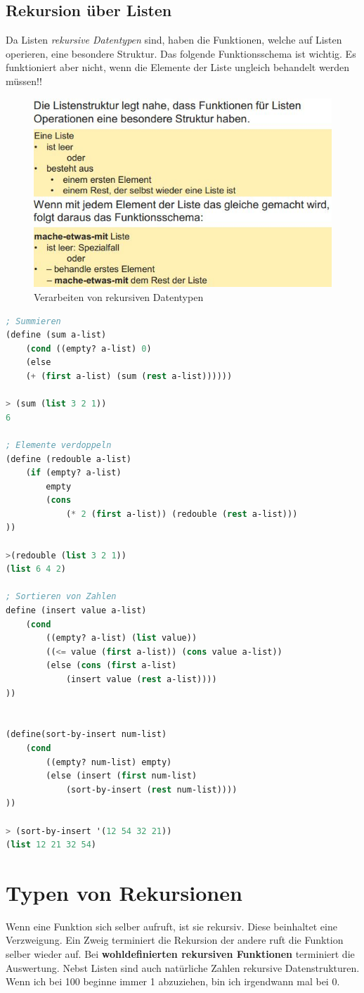 \subsection{Rekursion über Listen}
Da Listen \emph{rekursive Datentypen} sind, haben die Funktionen, welche auf Listen operieren, eine besondere Struktur. Das folgende Funktionsschema ist wichtig. Es funktioniert aber nicht, wenn die Elemente der Liste ungleich behandelt werden müssen!!

\begin{figure}[h!]
\centering
\includegraphics[width=0.7\linewidth]{fig/scheme-recursive-function-schema}
\caption{Verarbeiten von rekursiven Datentypen}
\label{fig:scheme-recursive-function-schema}
\end{figure}

\begin{lstlisting}[language=Lisp, caption=Funktionen auf listen]
; Summieren
(define (sum a-list)
	(cond ((empty? a-list) 0)
	(else
	(+ (first a-list) (sum (rest a-list))))))
	
> (sum (list 3 2 1))
6

; Elemente verdoppeln
(define (redouble a-list)
	(if (empty? a-list)
		empty
		(cons
			(* 2 (first a-list)) (redouble (rest a-list)))
))

>(redouble (list 3 2 1))
(list 6 4 2)

; Sortieren von Zahlen
define (insert value a-list)
	(cond
		((empty? a-list) (list value))
		((<= value (first a-list)) (cons value a-list))
		(else (cons (first a-list)
			(insert value (rest a-list))))
))


(define(sort-by-insert num-list)
	(cond
		((empty? num-list) empty)
		(else (insert (first num-list)
			(sort-by-insert (rest num-list))))
))

> (sort-by-insert '(12 54 32 21))
(list 12 21 32 54)
\end{lstlisting}

\section{Typen von Rekursionen}
Wenn eine Funktion sich selber aufruft, ist sie rekursiv. Diese beinhaltet eine Verzweigung. Ein Zweig terminiert die Rekursion der andere ruft die Funktion selber wieder auf. Bei \textbf{wohldefinierten rekursiven Funktionen} terminiert die Auswertung. Nebst Listen sind auch natürliche Zahlen rekursive Datenstrukturen. Wenn ich bei 100 beginne immer 1 abzuziehen, bin ich irgendwann mal bei 0.

